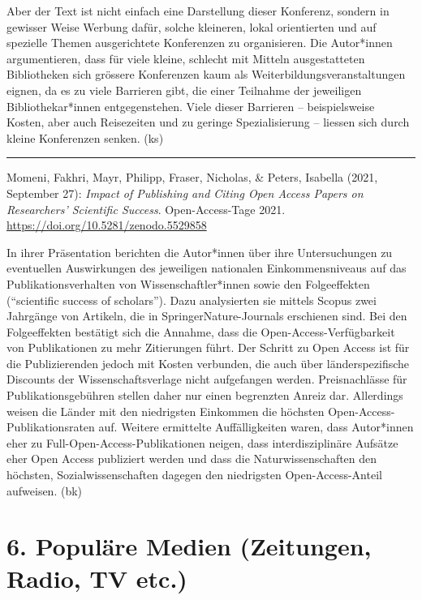 \documentclass[a4paper,
fontsize=11pt,
oneside,
numbers=noperiodatend,
parskip=half-,
bibliography=totoc,
final
]{scrartcl}
\begin{document}
Aber der Text ist nicht einfach eine Darstellung dieser Konferenz,
sondern in gewisser Weise Werbung dafür, solche kleineren, lokal
orientierten und auf spezielle Themen ausgerichtete Konferenzen zu
organisieren. Die Autor*innen argumentieren, dass für viele kleine,
schlecht mit Mitteln ausgestatteten Bibliotheken sich grössere
Konferenzen kaum als Weiterbildungsveranstaltungen eignen, da es zu
viele Barrieren gibt, die einer Teilnahme der jeweiligen
Bibliothekar*innen entgegenstehen. Viele dieser Barrieren --
beispielsweise Kosten, aber auch Reisezeiten und zu geringe
Spezialisierung -- liessen sich durch kleine Konferenzen senken. (ks)

\begin{center}\rule{0.5\linewidth}{0.5pt}\end{center}

Momeni, Fakhri, Mayr, Philipp, Fraser, Nicholas, \& Peters, Isabella
(2021, September 27): \emph{Impact of Publishing and Citing Open Access
Papers on Researchers' Scientific Success}. Open-Access-Tage 2021.
\url{https://doi.org/10.5281/zenodo.5529858}

In ihrer Präsentation berichten die Autor*innen über ihre Untersuchungen
zu eventuellen Auswirkungen des jeweiligen nationalen Einkommensniveaus
auf das Publikationsverhalten von Wissenschaftler*innen sowie den
Folgeeffekten (\enquote{scientific success of scholars}). Dazu
analysierten sie mittels Scopus zwei Jahrgänge von Artikeln, die in
SpringerNature-Journals erschienen sind. Bei den Folgeeffekten bestätigt
sich die Annahme, dass die Open-Access-Verfügbarkeit von Publikationen
zu mehr Zitierungen führt. Der Schritt zu Open Access ist für die
Publizierenden jedoch mit Kosten verbunden, die auch über
länderspezifische Discounts der Wissenschaftsverlage nicht aufgefangen
werden. Preisnachlässe für Publikationsgebühren stellen daher nur einen
begrenzten Anreiz dar. Allerdings weisen die Länder mit den niedrigsten
Einkommen die höchsten Open-Access-Publikationsraten auf. Weitere
ermittelte Auffälligkeiten waren, dass Autor*innen eher zu
Full-Open-Access-Publikationen neigen, dass interdisziplinäre Aufsätze
eher Open Access publiziert werden und dass die Naturwissenschaften den
höchsten, Sozialwissenschaften dagegen den niedrigsten
Open-Access-Anteil aufweisen. (bk)

\hypertarget{populuxe4re-medien-zeitungen-radio-tv-etc.}{%
\section{6. Populäre Medien (Zeitungen, Radio, TV
etc.)}\label{populuxe4re-medien-zeitungen-radio-tv-etc.}}
\end{document}
